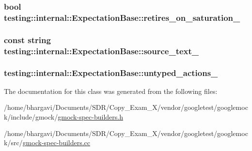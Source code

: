 \subsubsection[{\texorpdfstring{retires\+\_\+on\+\_\+saturation\+\_\+}{retires_on_saturation_}}]{\setlength{\rightskip}{0pt plus 5cm}bool testing\+::internal\+::\+Expectation\+Base\+::retires\+\_\+on\+\_\+saturation\+\_\+\hspace{0.3cm}{\ttfamily [protected]}}\hypertarget{classtesting_1_1internal_1_1_expectation_base_a74802f3bedf4ab023b30ee6bb275a4d8}{}\label{classtesting_1_1internal_1_1_expectation_base_a74802f3bedf4ab023b30ee6bb275a4d8}
\subsubsection[{\texorpdfstring{source\+\_\+text\+\_\+}{source_text_}}]{\setlength{\rightskip}{0pt plus 5cm}const {\bf string} testing\+::internal\+::\+Expectation\+Base\+::source\+\_\+text\+\_\+\hspace{0.3cm}{\ttfamily [protected]}}\hypertarget{classtesting_1_1internal_1_1_expectation_base_a8803b5fa8354205a6b57e21a704acbef}{}\label{classtesting_1_1internal_1_1_expectation_base_a8803b5fa8354205a6b57e21a704acbef}
\subsubsection[{\texorpdfstring{untyped\+\_\+actions\+\_\+}{untyped_actions_}}]{ testing\+::internal\+::\+Expectation\+Base\+::untyped\+\_\+actions\+\_\+\hspace{0.3cm}{\ttfamily [protected]}}\hypertarget{classtesting_1_1internal_1_1_expectation_base_a9558ff6b8b1b7e3a99fac1f93d1826da}{}\label{classtesting_1_1internal_1_1_expectation_base_a9558ff6b8b1b7e3a99fac1f93d1826da}


The documentation for this class was generated from the following files\+:\begin{DoxyCompactItemize}
\item 
/home/bhargavi/\+Documents/\+S\+D\+R/\+Copy\+\_\+\+Exam\+\_\+X/vendor/googletest/googlemock/include/gmock/\hyperlink{gmock-spec-builders_8h}{gmock-\/spec-\/builders.\+h}\item 
/home/bhargavi/\+Documents/\+S\+D\+R/\+Copy\+\_\+\+Exam\+\_\+X/vendor/googletest/googlemock/src/\hyperlink{gmock-spec-builders_8cc}{gmock-\/spec-\/builders.\+cc}\end{DoxyCompactItemize}
